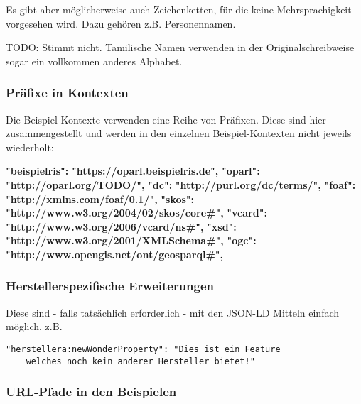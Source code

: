 \documentclass[,a4paper]{article}
\newenvironment{Shaded}{}{}
\newcommand{\ErrorTok}[1]{\textcolor[rgb]{1.00,0.00,0.00}{\textbf{{#1}}}}
\begin{document}
Es gibt aber möglicherweise auch Zeichenketten, für die keine
Mehrsprachigkeit vorgesehen wird. Dazu gehören z.B. Personennamen.

TODO: Stimmt nicht. Tamilische Namen verwenden in der
Originalschreibweise sogar ein vollkommen anderes Alphabet.

\subsubsection{Präfixe in Kontexten}\label{pruxe4fixe-in-kontexten}

Die Beispiel-Kontexte verwenden eine Reihe von Präfixen. Diese sind hier
zusammengestellt und werden in den einzelnen Beispiel-Kontexten nicht
jeweils wiederholt:

\begin{Shaded}
\begin{Highlighting}[]
    \ErrorTok{"beispielris":} \ErrorTok{"https://oparl.beispielris.de",}
    \ErrorTok{"oparl":} \ErrorTok{"http://oparl.org/TODO/",}
    \ErrorTok{"dc":} \ErrorTok{"http://purl.org/dc/terms/",}
    \ErrorTok{"foaf":} \ErrorTok{"http://xmlns.com/foaf/0.1/",}
    \ErrorTok{"skos":} \ErrorTok{"http://www.w3.org/2004/02/skos/core#",}
    \ErrorTok{"vcard":} \ErrorTok{"http://www.w3.org/2006/vcard/ns#",}
    \ErrorTok{"xsd":} \ErrorTok{"http://www.w3.org/2001/XMLSchema#",}
    \ErrorTok{"ogc":} \ErrorTok{"http://www.opengis.net/ont/geosparql#",}
\end{Highlighting}
\end{Shaded}

\subsubsection{Herstellerspezifische
Erweiterungen}\label{herstellerspezifische-erweiterungen}

Diese sind - falls tatsächlich erforderlich - mit den JSON-LD Mitteln
einfach möglich. z.B.

\begin{verbatim}
"herstellera:newWonderProperty": "Dies ist ein Feature
    welches noch kein anderer Hersteller bietet!"
\end{verbatim}

\subsubsection{URL-Pfade in den
Beispielen}\label{url-pfade-in-den-beispielen}
\end{document}
